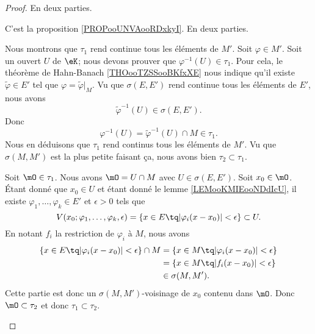 \begin{proof}
	En deux parties.
	\begin{subproof}
		C'est la proposition \ref{PROPooUNVAooRDxkyI}.
		En deux parties.
		\begin{subproof}
			Nous montrons que \( \tau_1\) rend continue tous les éléments de \( M'\). Soit \( \varphi\in M'\). Soit un ouvert \( U\) de \( \eK\); nous devons prouver que \( \varphi^{-1}(U)\in \tau_1\). Pour cela, le théorème de Hahn-Banach \ref{THOooTZSSooBKfxXE} nous indique qu'il existe \( \tilde \varphi\in E'\) tel que \( \varphi=\tilde \varphi|_M\). Vu que \( \sigma(E,E')\) rend continue tous les éléments de \( E'\), nous avons
			\begin{equation}
				\tilde \varphi^{-1}(U)\in \sigma(E,E').
			\end{equation}
			Donc
			\begin{equation}
				\varphi^{-1}(U)=\tilde \varphi^{-1}(U)\cap M\in \tau_1.
			\end{equation}
			Nous en déduisons que \( \tau_1\) rend continus tous les éléments de \( M'\). Vu que \( \sigma(M,M')\) est la plus petite faisant ça, nous avons bien \( \tau_2\subset\tau_1\).

			Soit \( \mO\in \tau_1\). Nous avons \( \mO=U\cap M\) avec \( U\in\sigma(E,E')\). Soit \( x_0\in\mO\). Étant donné que \( x_0\in U\) et étant donné le lemme \ref{LEMooKMIEooNDdIcU}, il existe \( \varphi_1,\ldots,\varphi_k\in E'\) et \( \epsilon>0\) tels que
			\begin{equation}
				V(x_0;\varphi_1,\ldots,\varphi_k,\epsilon)=\{ x\in E\tq | \varphi_i(x-x_0) |<\epsilon \}\subset U.
			\end{equation}
			En notant \( f_i\) la restriction de \( \varphi_i\) à \( M\), nous avons
			\begin{subequations}
				\begin{align}
					\{ x\in E\tq |\varphi_i(x-x_0)|<\epsilon \}\cap M & =\{ x\in M\tq | \varphi_i(x-x_0) |<\epsilon \} \\
					                                                  & =\{ x\in M\tq | f_i(x-x_0) |<\epsilon \}       \\
					                                                  & \in\sigma(M,M').
				\end{align}
			\end{subequations}
			Cette partie est donc un \( \sigma(M,M')\)-voisinage de \( x_0\) contenu dans \( \mO\). Donc \( \mO\subset \tau_2\) et donc \( \tau_1\subset\tau_2\).
		\end{subproof}
	\end{subproof}
\end{proof}

